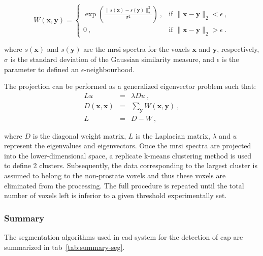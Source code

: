 \begin{equation}
	W(\mathbf{x},\mathbf{y}) =
	\begin{cases}	
	 	\exp \left( \frac{\| s(\mathbf{x}) - s(\mathbf{y}) \|_2^2}{\sigma^2} \right) \ , & \text{if } \| \mathbf{x} - \mathbf{y} \|_2 < \epsilon \ , \\
	 	0 \ , & \text{if } \| \mathbf{x} - \mathbf{y} \|_2 > \epsilon \ .
	 \end{cases}
	\label{eq:ge1}
\end{equation}

\noindent where $s(\mathbf{x})$ and $s(\mathbf{y})$ are the \ac{mrsi} spectra for the voxels $\mathbf{x}$ and $\mathbf{y}$, respectively, $\sigma$ is the standard deviation of the Gaussian similarity measure, and $\epsilon$ is the parameter to defined an $\epsilon$-neighbourhood.

The projection can be performed as a generalized eigenvector problem such that:
\begin{eqnarray}
  Lu & = & \lambda D u \ , \nonumber \\
  D(\mathbf{x},\mathbf{x}) & = & \sum_{\mathbf{y}} W(\mathbf{x},\mathbf{y}) \ , \label{eq:ge2} \\
  L & = & D-W \ , \nonumber
\end{eqnarray}

\noindent where $D$ is the diagonal weight matrix, $L$ is the Laplacian matrix, $\lambda$ and $u$ represent the eigenvalues and eigenvectors.
Once the \ac{mrsi} spectra are projected into the lower-dimensional space, a replicate k-means clustering method is used to define 2 clusters.
Subsequently, the data corresponding to the largest cluster is assumed to belong to the non-prostate voxels and thus these voxels are eliminated from the processing.
The full procedure is repeated until the total number of voxels left is inferior to a given threshold experimentally set.


\subsubsection{Summary}

The segmentation algorithms used in \ac{cad} system for the detection of \ac{cap} are summarized in \ac{tab}~\ref{tab:summary-seg}.


